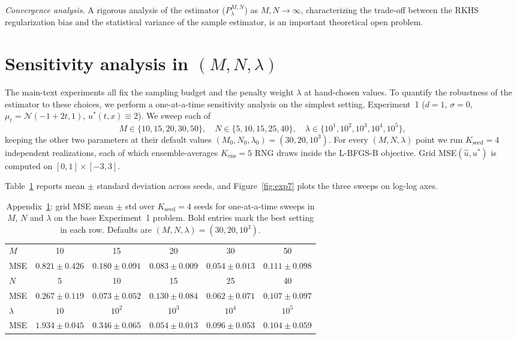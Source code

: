 \documentclass[11pt,leqno]{article}
\theoremstyle{plain}
\theoremstyle{remark}
\theoremstyle{definition}
\numberwithin{equation}{section}
\numberwithin{figure}{section}
\numberwithin{table}{section}
\begin{document}
\emph{Convergence analysis.}
A rigorous analysis of the estimator ($P_{\lambda}^{M,N}$) as $M,N\to\infty$,
characterizing the trade-off between the RKHS regularization bias and the
statistical variance of the sample estimator, is an important
theoretical open problem.


\appendix

\section{Sensitivity analysis in $(M, N, \lambda)$}
\label{sec:exp-sensitivity}

The main-text experiments all fix the sampling budget and the penalty
weight $\lambda$ at hand-chosen values.  To quantify the robustness of
the estimator to these choices, we perform a one-at-a-time sensitivity
analysis on the simplest setting, Experiment~1 ($d=1$, $\sigma=0$,
$\mu_t=\mathcal{N}(-1+2t,1)$, $u^{\!*}(t,x)\equiv 2$).  We sweep each of
\[
  M \in \{10,15,20,30,50\}, \quad
  N \in \{5,10,15,25,40\}, \quad
  \lambda \in \{10^{1},10^{2},10^{3},10^{4},10^{5}\},
\]
keeping the other two parameters at their default values
$(M_0, N_0, \lambda_0) = (30, 20, 10^{3})$.  For every
$(M, N, \lambda)$ point we run $K_{\mathrm{seed}}=4$ independent
realizations, each of which ensemble-averages $K_{\mathrm{ens}}=5$
RNG draws inside the L-BFGS-B objective.  Grid
MSE$(\hat u, u^{\!*})$ is computed on
$[0,1]\times[-3,3]$.

Table~\ref{tab:exp7} reports mean $\pm$ standard deviation across
seeds, and Figure~\ref{fig:exp7} plots the three sweeps on log-log
axes.

\begin{table}[ht]
\centering
\small
\begin{tabular}{lccccc}
\toprule
 $M$      & 10 & 15 & 20 & 30 & 50 \\
 MSE      & $0.821\pm0.426$ & $0.180\pm0.091$ & $0.083\pm0.009$
          & $\mathbf{0.054\pm0.013}$ & $0.111\pm0.098$ \\
\midrule
 $N$      & 5 & 10 & 15 & 25 & 40 \\
 MSE      & $0.267\pm0.119$ & $0.073\pm0.052$ & $0.130\pm0.084$
          & $\mathbf{0.062\pm0.071}$ & $0.107\pm0.097$ \\
\midrule
 $\lambda$& $10$ & $10^{2}$ & $10^{3}$ & $10^{4}$ & $10^{5}$ \\
 MSE      & $1.934\pm0.045$ & $0.346\pm0.065$ & $\mathbf{0.054\pm0.013}$
          & $0.096\pm0.053$ & $0.104\pm0.059$ \\
\bottomrule
\end{tabular}
\caption{Appendix~\ref{sec:exp-sensitivity}: grid MSE mean $\pm$ std over
$K_{\mathrm{seed}}=4$ seeds for one-at-a-time sweeps in $M$, $N$ and
$\lambda$ on the base Experiment~1 problem.  Bold entries mark the
best setting in each row.  Defaults are
$(M, N, \lambda)=(30, 20, 10^{3})$.}
\label{tab:exp7}
\end{table}
\end{document}
